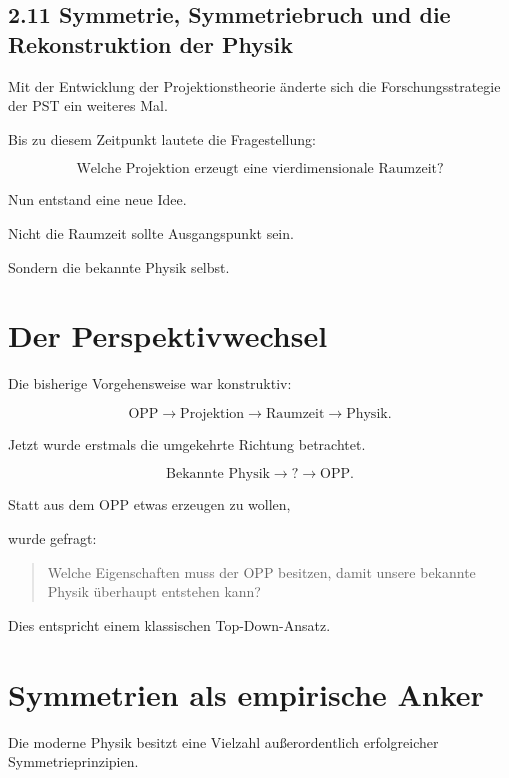 \subsection{2.11 Symmetrie, Symmetriebruch und die Rekonstruktion der Physik}

Mit der Entwicklung der Projektionstheorie änderte sich die Forschungsstrategie der PST ein weiteres Mal.

Bis zu diesem Zeitpunkt lautete die Fragestellung:

\[
\boxed{
\text{Welche Projektion erzeugt eine vierdimensionale Raumzeit?}
}
\]

Nun entstand eine neue Idee.

Nicht die Raumzeit sollte Ausgangspunkt sein.

Sondern die bekannte Physik selbst.


\section*{Der Perspektivwechsel}

Die bisherige Vorgehensweise war konstruktiv:

\[
\text{OPP}
\longrightarrow
\text{Projektion}
\longrightarrow
\text{Raumzeit}
\longrightarrow
\text{Physik}.
\]

Jetzt wurde erstmals die umgekehrte Richtung betrachtet.

\[
\boxed{
\text{Bekannte Physik}
\longrightarrow
?
\longrightarrow
\text{OPP}.
}
\]

Statt aus dem OPP etwas erzeugen zu wollen,

wurde gefragt:

\begin{quote}
Welche Eigenschaften muss der OPP besitzen, damit unsere bekannte Physik überhaupt entstehen kann?
\end{quote}

Dies entspricht einem klassischen Top-Down-Ansatz.


\section*{Symmetrien als empirische Anker}

Die moderne Physik besitzt eine Vielzahl außerordentlich erfolgreicher Symmetrieprinzipien.

